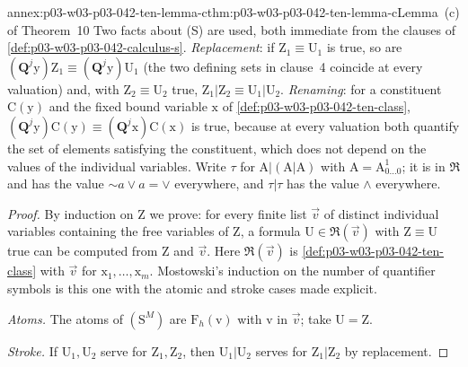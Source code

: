 \begin{annexitem}{annex:p03-w03-p03-042-ten-lemma-c}{thm:p03-w03-p03-042-ten-lemma-c}{Lemma~(c) of Theorem~10}
Two facts about (S) are used, both immediate from the clauses of
\cref{def:p03-w03-p03-042-calculus-s}.  \emph{Replacement}: if
\(\mathrm Z_1\equiv\mathrm U_1\) is true, so are \((\mathbf Q^j\mathrm y)
\mathrm Z_1\equiv(\mathbf Q^j\mathrm y)\mathrm U_1\) (the two defining
sets in clause~4 coincide at every valuation) and, with \(\mathrm
Z_2\equiv\mathrm U_2\) true, \(\mathrm Z_1|\mathrm Z_2\equiv\mathrm
U_1|\mathrm U_2\).  \emph{Renaming}: for a constituent \(\mathrm C(\mathrm
y)\) and the fixed bound variable \(\mathrm x\) of
\cref{def:p03-w03-p03-042-ten-class}, \((\mathbf Q^j\mathrm y)\mathrm
C(\mathrm y)\equiv(\mathbf Q^j\mathrm x)\mathrm C(\mathrm x)\) is true,
because at every valuation both quantify the set of elements satisfying
the constituent, which does not depend on the values of the individual
variables.  Write \(\tau\) for \(\mathrm A|(\mathrm A|\mathrm A)\) with
\(\mathrm A=\mathrm A^1_{0\ldots0}\); it is in \(\mathfrak R\) and has the
value \({\sim}a\vee a=\vee\) everywhere, and \(\tau|\tau\) has the value
\(\wedge\) everywhere.
\begin{proof}
By induction on \(\mathrm Z\) we prove: for every finite list \(\vec v\)
of distinct individual variables containing the free variables of
\(\mathrm Z\), a formula \(\mathrm U\in\mathfrak R(\vec v)\) with
\(\mathrm Z\equiv\mathrm U\) true can be computed from \(\mathrm Z\) and
\(\vec v\).  Here \(\mathfrak R(\vec v)\) is
\cref{def:p03-w03-p03-042-ten-class} with \(\vec v\) for \(\mathrm
x_1,\ldots,\mathrm x_m\).  Mostowski's induction on the number of
quantifier symbols is this one with the atomic and stroke cases made
explicit.

\emph{Atoms.}  The atoms of \((\mathrm S^M)\) are \(\mathrm F_h(\mathrm
v)\) with \(\mathrm v\) in \(\vec v\); take \(\mathrm U=\mathrm Z\).

\emph{Stroke.}  If \(\mathrm U_1,\mathrm U_2\) serve for \(\mathrm
Z_1,\mathrm Z_2\), then \(\mathrm U_1|\mathrm U_2\) serves for
\(\mathrm Z_1|\mathrm Z_2\) by replacement.


\end{proof}
\end{annexitem}

